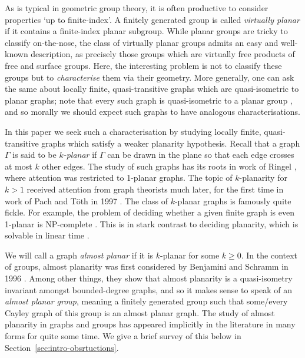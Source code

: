 \documentclass[11pt,a4paper]{amsart}
\newcommand{\Z}{\mathbb{Z}}
\theoremstyle{definition}
\begin{document}
As is typical in geometric group theory, it is often productive to consider properties `up to finite-index'. A finitely generated group is called \emph{virtually planar} if it contains a finite-index planar subgroup. While planar groups are tricky to classify on-the-nose, the class of virtually planar groups admits an easy and well-known description, as precisely those groups which are virtually free products of free and surface groups. Here, the interesting problem is not to classify these groups but to \emph{characterise} them via their geometry. More generally, one can ask the same about locally finite, quasi-transitive graphs which are quasi-isometric to planar graphs; note that every such graph is quasi-isometric to a planar group \cite{macmanus2024note}, and so morally we should expect such graphs to have analogous characterisations.

In this paper we seek such a characterisation by studying locally finite, quasi-transitive graphs which satisfy a weaker planarity hypothesis. 
Recall that a graph $\Gamma$ is said to be \emph{$k$-planar} if $\Gamma$ can be drawn in the plane so that each edge crosses at most $k$ other edges. The study of such graphs has its roots in work of Ringel \cite{ringel1965sechsfarbenproblem}, where attention was restricted to 1-planar graphs. The topic of $k$-planarity for $k > 1$ received attention from graph theorists much later, for the first time in work of Pach and T\"oth in 1997 \cite{pach1997graphs}.
The class of $k$-planar graphs is famously quite fickle. For example, the problem of deciding whether a given finite graph is even 1-planar is $\mathrm{NP}$-complete \cite{grigoriev2007algorithms}. This is in stark contrast to deciding planarity, which is solvable in linear time \cite{hopcroft1974efficient}. 

We will call  a graph \emph{almost planar} if it is $k$-planar for some $k \geq 0$. 
In the context of groups, almost planarity was first considered by Benjamini and Schramm in 1996 \cite{benjamini1996harmonic}.  Among other things, they show that almost planarity is a quasi-isometry invariant amongst bounded-degree graphs, and so it makes sense to speak of an \emph{almost planar group}, meaning a finitely generated group such that some/every Cayley graph of this group is an almost planar graph.  
The study of almost planarity in graphs and groups has appeared implicitly in the literature in many forms for quite some time. We give a brief survey of this below in Section~\ref{sec:intro-obsrtuctions}. 
\end{document}
